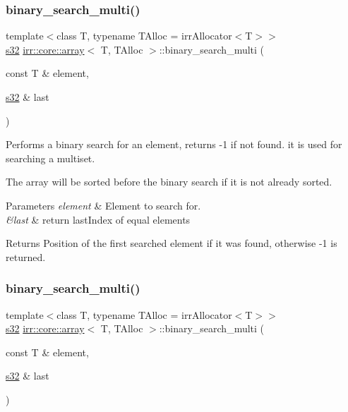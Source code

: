\subsubsection{\texorpdfstring{binary\+\_\+search\+\_\+multi()}{binary\_search\_multi()}\hspace{0.1cm}{\footnotesize\ttfamily [1/2]}}
{\footnotesize\ttfamily template$<$class T, typename T\+Alloc = irr\+Allocator$<$\+T$>$$>$ \\
\hyperlink{namespaceirr_ac66849b7a6ed16e30ebede579f9b47c6}{s32} \hyperlink{classirr_1_1core_1_1array}{irr\+::core\+::array}$<$ T, T\+Alloc $>$\+::binary\+\_\+search\+\_\+multi (\begin{DoxyParamCaption}\item[{const T \&}]{element,  }\item[{\hyperlink{namespaceirr_ac66849b7a6ed16e30ebede579f9b47c6}{s32} \&}]{last }\end{DoxyParamCaption})\hspace{0.3cm}{\ttfamily [inline]}}



Performs a binary search for an element, returns -\/1 if not found. it is used for searching a multiset. 

The array will be sorted before the binary search if it is not already sorted. 
\begin{DoxyParams}{Parameters}
{\em element} & Element to search for. \\
\hline
{\em \&last} & return last\+Index of equal elements \\
\hline
\end{DoxyParams}
\begin{DoxyReturn}{Returns}
Position of the first searched element if it was found, otherwise -\/1 is returned. 
\end{DoxyReturn}
\mbox{\label{classirr_1_1core_1_1array_a62821cac92125dd76f96f21e60ca94a4}} 
\subsubsection{\texorpdfstring{binary\+\_\+search\+\_\+multi()}{binary\_search\_multi()}\hspace{0.1cm}{\footnotesize\ttfamily [2/2]}}
{\footnotesize\ttfamily template$<$class T, typename T\+Alloc = irr\+Allocator$<$\+T$>$$>$ \\
\hyperlink{namespaceirr_ac66849b7a6ed16e30ebede579f9b47c6}{s32} \hyperlink{classirr_1_1core_1_1array}{irr\+::core\+::array}$<$ T, T\+Alloc $>$\+::binary\+\_\+search\+\_\+multi (\begin{DoxyParamCaption}\item[{const T \&}]{element,  }\item[{\hyperlink{namespaceirr_ac66849b7a6ed16e30ebede579f9b47c6}{s32} \&}]{last }\end{DoxyParamCaption})\hspace{0.3cm}{\ttfamily [inline]}}



